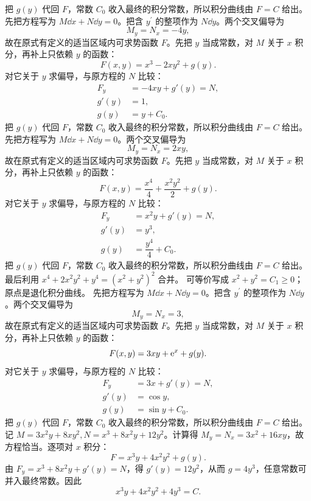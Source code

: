 把 $g(y)$ 代回 $F$，常数 $C_0$ 收入最终的积分常数，所以积分曲线由 $F=C$ 给出。
先把方程写为 $M\dd x+N\dd y=0$。把含 $y^{\prime}$ 的整项作为 $N\dd y$。两个交叉偏导为
\[
M_y=N_x=-4y,
\]
故在原式有定义的适当区域内可求势函数 $F$。先把 $y$ 当成常数，对 $M$ 关于 $x$ 积分，再补上只依赖 $y$ 的函数：
\[
F(x,y)=x^3-2xy^2+g(y).
\]
对它关于 $y$ 求偏导，与原方程的 $N$ 比较：
\[
\begin{aligned}
F_y&=-4xy+g'(y)=N,\\
g'(y)&=1,\\
g(y)&=y+C_0.
\end{aligned}
\]
把 $g(y)$ 代回 $F$，常数 $C_0$ 收入最终的积分常数，所以积分曲线由 $F=C$ 给出。
先把方程写为 $M\dd x+N\dd y=0$。两个交叉偏导为
\[
M_y=N_x=2xy,
\]
故在原式有定义的适当区域内可求势函数 $F$。先把 $y$ 当成常数，对 $M$ 关于 $x$ 积分，再补上只依赖 $y$ 的函数：
\[
F(x,y)=\dfrac{x^4}{4}+\dfrac{x^2y^2}{2}+g(y).
\]
对它关于 $y$ 求偏导，与原方程的 $N$ 比较：
\[
\begin{aligned}
F_y&=x^2y+g'(y)=N,\\
g'(y)&=y^3,\\
g(y)&=\dfrac{y^4}{4}+C_0.
\end{aligned}
\]
把 $g(y)$ 代回 $F$，常数 $C_0$ 收入最终的积分常数，所以积分曲线由 $F=C$ 给出。
最后利用 $x^4+2x^2y^2+y^4=(x^2+y^2)^2$ 合并。
可等价写成 $x^2+y^2=C_1\ge0$；原点是退化积分曲线。
先把方程写为 $M\dd x+N\dd y=0$。把含 $y^{\prime}$ 的整项作为 $N\dd y$。两个交叉偏导为
\[
M_y=N_x=3,
\]
故在原式有定义的适当区域内可求势函数 $F$。先把 $y$ 当成常数，对 $M$ 关于 $x$ 积分，再补上只依赖 $y$ 的函数：
\[
F(x,y)=3xy+\mathrm e^x+g(y).
\]
对它关于 $y$ 求偏导，与原方程的 $N$ 比较：
\[
\begin{aligned}
F_y&=3x+g'(y)=N,\\
g'(y)&=\cos y,\\
g(y)&=\sin y+C_0.
\end{aligned}
\]
把 $g(y)$ 代回 $F$，常数 $C_0$ 收入最终的积分常数，所以积分曲线由 $F=C$ 给出。
记 $M=3x^2y+8xy^2,N=x^3+8x^2y+12y^2$。计算得 $M_y=N_x=3x^2+16xy$，故方程恰当。逐项对 $x$ 积分：
\[
F=x^3y+4x^2y^2+g(y).
\]
由 $F_y=x^3+8x^2y+g'(y)=N$，得 $g'(y)=12y^2$，从而 $g=4y^3$，任意常数可并入最终常数。因此
\[
x^3y+4x^2y^2+4y^3=C.
\]
